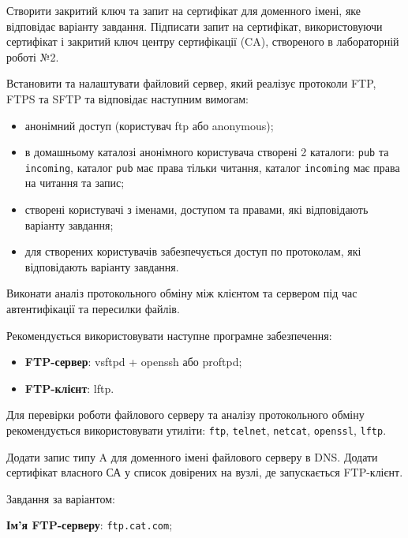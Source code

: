 \documentclass[14pt, a4paper]{extreport}
\begin{document}
	Створити закритий ключ та запит на сертифікат для доменного імені, яке відповідає варіанту завдання. Підписати запит на сертифікат, використовуючи сертифікат і закритий ключ центру сертифікації (CA), створеного в лабораторній роботі №2.
	
	Встановити та налаштувати файловий сервер, який реалізує протоколи FTP, FTPS та SFTP та відповідає наступним вимогам:
	
	\begin{itemize}
		\item анонімний доступ (користувач ftp або anonymous);
		
		\item в домашньому каталозі анонімного користувача створені 2 каталоги: \texttt{pub} та \texttt{incoming}, каталог \texttt{pub} має права тільки читання, каталог \texttt{incoming} має права на читання та запис;
		
		\item створені користувачі з іменами, доступом та правами, які відповідають варіанту завдання;
		
		\item для створених користувачів забезпечується доступ по протоколам, які відповідають варіанту завдання.
	\end{itemize}
	
	Виконати аналіз протокольного обміну між клієнтом та сервером під час автентифікації та пересилки файлів.
	
	Рекомендується використовувати наступне програмне забезпечення:
	
	\begin{itemize}
		\item \textbf{FTP-сервер}: vsftpd + openssh або proftpd;
		
		\item \textbf{FTP-клієнт}: lftp.
	\end{itemize}
	
	Для перевірки роботи файлового серверу та аналізу протокольного обміну рекомендується використовувати утиліти: \texttt{ftp}, \texttt{telnet}, \texttt{netcat}, \texttt{openssl}, \texttt{lftp}.
	
	Додати запис типу A для доменного імені файлового серверу в DNS. Додати сертифікат власного СА у список довірених на вузлі, де запускається FTP-клієнт.
	
	Завдання за варіантом:
	
	\textbf{Ім'я FTP-серверу}: \texttt{ftp.cat.com};
	
\end{document}
